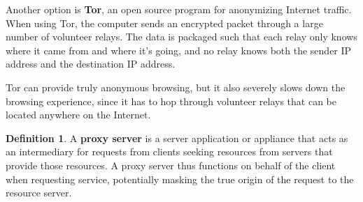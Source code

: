 \documentclass[a4paper, 12pt]{report}
\theoremstyle{remark}
\theoremstyle{definition}
\newtheorem{definition}{Definition}[section]
\begin{document}
Another option is \textbf{Tor}, an open source program for anonymizing Internet traffic.  When using Tor, the computer sends an encrypted packet through a large number of volunteer relays. The data is packaged such that each relay only knows where it came from and where it's going, and no relay knows both the sender IP address and the destination IP address. 
 
Tor can provide truly anonymous browsing, but it also severely slows down the browsing experience, since it has to hop through volunteer relays that can be located anywhere on the Internet. 

\begin{definition}
A \textbf{proxy server} is a server application or appliance that acts as an intermediary for requests from clients seeking resources from servers that provide those resources. A proxy server thus functions on behalf of the client when requesting service, potentially masking the true origin of the request to the resource server. 


\end{definition}
\end{document}
